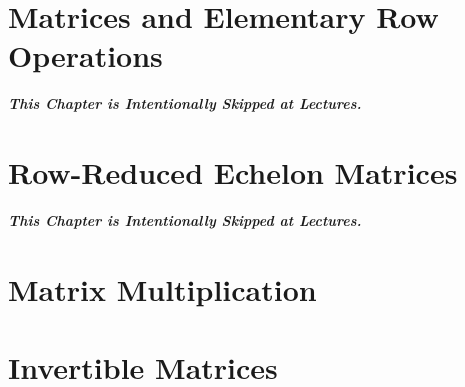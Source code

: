 \documentclass[C:/LATEX/MAS212/Summary/MAS212.tex]{subfiles}
\begin{document}
\section{Matrices and Elementary Row Operations}

\textit{\textbf{This Chapter is Intentionally Skipped at Lectures.}}

\section{Row-Reduced Echelon Matrices}

\textit{\textbf{This Chapter is Intentionally Skipped at Lectures.}}

\section{Matrix Multiplication}



\section{Invertible Matrices}

\end{document}
